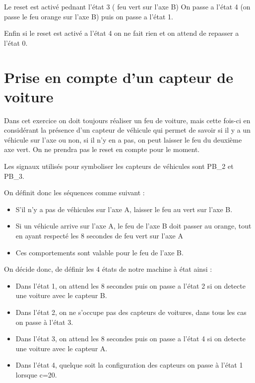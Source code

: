 \documentclass[11pt]{report}
\begin{document}
Le reset est activé pednant l'état 3 ( feu vert sur l'axe B)
On passe a l'état 4 (on passe le feu orange sur l'axe B) puis on passe a l'état 1.

Enfin si le reset est activé a l'état 4 on ne fait rien et on attend de repasser a l'état 0.



\section{Prise en compte d'un capteur de voiture}


Dans cet exercice on doit toujours réaliser un feu de voiture, mais cette fois-ci en considérant la présence d'un capteur de véhicule qui permet de savoir si il y a un véhicule sur l'axe ou non, si il n'y en a pas, on peut laisser le feu du deuxième axe vert. On ne prendra pas le reset en compte pour le moment.

Les signaux utilisés pour symboliser les capteurs de véhicules sont PB\_2 et PB\_3.

On définit donc les séquences comme suivant :
\begin{itemize}
	\item S'il n'y a pas de véhicules sur l'axe A, laisser le feu au vert sur l'axe B.
	\item Si un véhicule arrive sur l'axe A, le feu de l'axe B doit passer au orange, tout en ayant respecté les 8 secondes de feu vert sur l'axe A
	\item Ces comportements sont valable pour le feu de l'axe B.

\end{itemize}

On décide donc, de définir les 4 états de notre machine à état ainsi :
\begin{itemize}
\item Dans l'état 1, on attend les 8 secondes puis on passe a l'état 2 si on detecte une voiture avec le capteur B.
\item Dans l'état 2, on ne s'occupe pas des capteurs de voitures, dans tous les cas on passe à l'état 3.
\item Dans l'état 3, on attend les 8 secondes puis on passe a l'état 4 si on detecte une voiture avec le capteur A.
\item Dans l'état 4, quelque soit la configuration des capteurs on passe à l'état 1 lorsque c=20.


\end{itemize}
\end{document}
